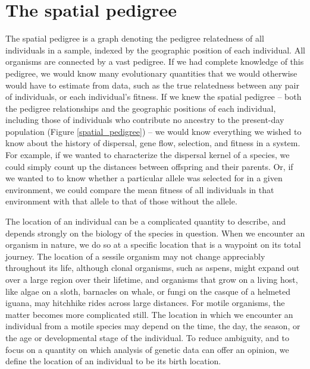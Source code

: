 \documentclass{ar-1col}
\newcommand{\todo}[1]{{\textbf{\color{red}{#1}}}}
\begin{document}
\section{The spatial pedigree}

\todo{read through and edit}

The spatial pedigree is
a graph denoting the pedigree relatedness of all individuals in a sample,
indexed by the geographic position of each individual.
All organisms are connected by a vast pedigree.
If we had complete knowledge of this pedigree,
we would know many evolutionary quantities
that we would otherwise would have to estimate from data,
such as the true relatedness between any pair of individuals,
or each individual's fitness.
If we knew the spatial pedigree -- 
both the pedigree relationships
and the geographic positions of each individual,
including those of individuals
who contribute no ancestry to the present-day population 
(Figure \ref{spatial_pedigree}) -- 
we would know everything we wished to know about
the history of dispersal, gene flow,
selection, and fitness in a system.
For example, if we wanted to characterize the dispersal kernel of a species,
we could simply count up the distances between offspring and their parents.
Or, if we wanted to to know whether a particular allele
was selected for in a given environment,
we could compare the mean fitness of all individuals in that environment with that allele
to that of those without the allele.

The location of an individual can be a complicated quantity to describe,
and depends strongly on the biology of the species in question.
When we encounter an organism in nature,
we do so at a specific location
that is a waypoint on its total journey.
The location of a sessile organism
may not change appreciably throughout its life,
although clonal organisms,
such as aspens,
might expand out over a large region over their lifetime,
and organisms that grow on a living host,
like algae on a sloth,
barnacles on whale,
or fungi on the casque of a helmeted iguana,
may hitchhike rides across large distances.
For motile organisms,
the matter becomes more complicated still.
The location in which we encounter an individual
from a motile species may depend
on the time, the day, the season,
or the age or developmental stage of the individual.
To reduce ambiguity,
and to focus on a quantity
on which analysis of genetic data can offer an opinion,
we define the location of an individual to be its birth location.
\end{document}
